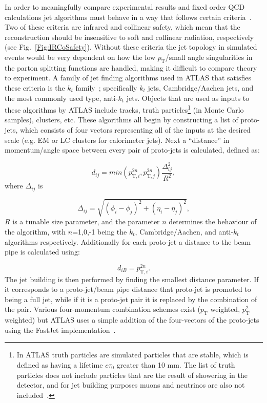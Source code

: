 In order to meaningfully compare experimental results and fixed order QCD calculations jet algorithms must behave in a way that follows certain criteria~\cite{Blazey:2000qt}.  
Two of these criteria are infrared and collinear safety, which mean that the reconstruction should be insensitive to soft and collinear radiation, respectively (see Fig.~\ref{Fig:IRCoSafety}).  
Without these criteria the jet topology in simulated events would be very dependent on how the low $p_{\mathrm T}$/small angle singularities in the parton splitting functions are handled, making it difficult to compare theory to experiment.  
A family of jet finding algorithms used in ATLAS that satisfies these criteria is the $k_t$ family~\cite{Cacciari:2008gp}; specifically $k_t$ jets, Cambridge/Aachen jets, and the most commonly used type, anti-$k_t$ jets.  
Objects that are used as inputs to these algorithms by ATLAS include tracks, truth particles\footnote{In ATLAS truth particles are simulated particles that are stable, which is defined as having a lifetime $c\tau _{\mathrm 0}$ greater than 10 mm.  The list of truth particles does not include particles that are the result of showering in the detector, and for jet building purposes muons and neutrinos are also not included~\cite{ATL-PHYS-PUB-2015-013}.}  (in Monte Carlo samples), clusters, etc.  
These algorithms all begin by constructing a list of proto-jets, which consists of four vectors representing all of the inputs at the desired scale (e.g. EM or LC clusters for calorimeter jets).  
Next a ``distance'' in momentum/angle space between every pair of proto-jets is calculated, defined as:

\begin{equation}
  d_{ij}=min\left(p_{\mathrm T,i}^{2n}, p_{\mathrm T,j}^{2n}\right)\frac{\Delta_{ij}^2}{R^2}, 
\end{equation}
\noindent
where $\Delta_{ij}$ is  

\begin{equation}
  \Delta_{ij} = \sqrt{ \left(\phi_i-\phi_j\right)^2+\left(\eta_i-\eta_j\right)^2}, 
\end{equation}
\noindent
$R$ is a tunable size parameter, and the parameter $n$ determines the behaviour of the algorithm, with $n$=1,0,-1 being the $k_t$, Cambridge/Aachen, and anti-$k_t$ algorithms respectively.  
Additionally for each proto-jet a distance to the beam pipe is calculated using:

\begin{equation}
  d_{iB} = p_{\mathrm T,i}^{2n}.
\end{equation}  
\noindent
The jet building is then performed by finding the smallest distance parameter.  
If it corresponds to a proto-jet/beam pipe distance that proto-jet is promoted to being a full jet, while if it is a proto-jet pair it is replaced by the combination of the pair.  
Various four-momentum combination schemes exist ($p_{\mathrm T}$ weighted, $p_{\mathrm T}^2$ weighted) but ATLAS uses a simple addition of the four-vectors of the proto-jets using the FastJet implementation~\cite{Cacciari:2011ma}.  

